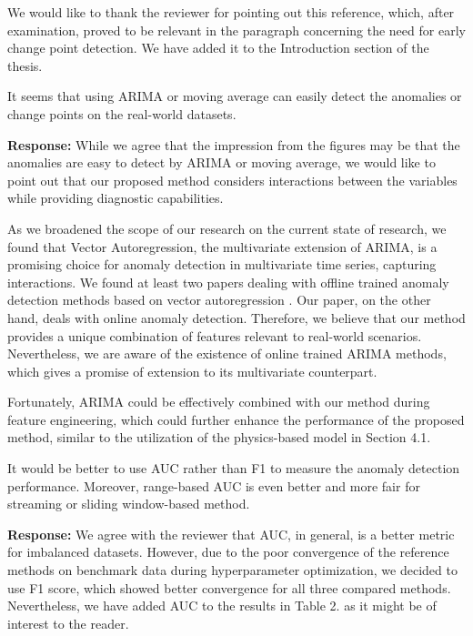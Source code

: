 \documentclass{article}
\makeatletter
\newenvironment{comment}{
\begin{sloppypar}\slshape
\vspace{5 mm}
\color{blue}
 \@beginparpenalty\@M
  \begin{list}{}{\setlength{\topsep}{0ex}%
  \setlength{\leftmargin}{\rightmargin}}\item[]
 \@beginparpenalty\@endparpenalty
}
{\end{list}
\end{sloppypar}
}
\makeatother
\begin{document}
\begin{enumerate}
        We would like to thank the reviewer for pointing out this reference, which, after examination, proved to be relevant in the paragraph concerning the need for early change point detection. We have added it to the Introduction section of the thesis.

  \item
        \begin{comment}
        It seems that using ARIMA or moving average can easily detect the anomalies or change points on the real-world datasets.
        \end{comment}
        {\bf Response:}
        While we agree that the impression from the figures may be that the anomalies are easy to detect by ARIMA or moving average, we would like to point out that our proposed method considers interactions between the variables while providing diagnostic capabilities.

        As we broadened the scope of our research on the current state of research, we found that Vector Autoregression, the multivariate extension of ARIMA, is a promising choice for anomaly detection in multivariate time series, capturing interactions. We found at least two papers dealing with offline trained anomaly detection methods based on vector autoregression \cite{Melnyk2016, Zhang2023}. Our paper, on the other hand, deals with online anomaly detection. Therefore, we believe that our method provides a unique combination of features relevant to real-world scenarios. Nevertheless, we are aware of the existence of online trained ARIMA methods, which gives a promise of extension to its multivariate counterpart.
        
        Fortunately, ARIMA could be effectively combined with our method during feature engineering, which could further enhance the performance of the proposed method, similar to the utilization of the physics-based model in Section 4.1.

  \item
        \begin{comment}
        It would be better to use AUC rather than F1 to measure the anomaly detection performance. Moreover, range-based AUC is even better and more fair for streaming or sliding window-based method.
        \end{comment}
        {\bf Response:}
        We agree with the reviewer that AUC, in general, is a better metric for imbalanced datasets. However, due to the poor convergence of the reference methods on benchmark data during hyperparameter optimization, we decided to use F1 score, which showed better convergence for all three compared methods. Nevertheless, we have added AUC to the results in Table 2. as it might be of interest to the reader.


\end{enumerate}
\end{document}
